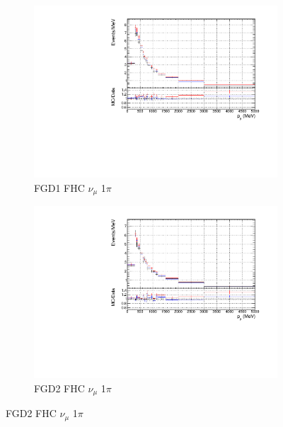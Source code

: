 \begin{figure}
\begin{subfigure}{0.49\textwidth}
  \centering
  \includegraphics[width=\textwidth]{figs/priorpred1D_p_FGD1_numuCC_1pi}
  \caption{FGD1 FHC $\nu_{\mu}$ 1$\pi$}
\end{subfigure}
\begin{subfigure}{0.49\textwidth}
  \centering
  \includegraphics[width=\textwidth]{figs/priorpred1D_p_FGD2_numuCC_1pi}
  \caption{FGD2 FHC $\nu_{\mu}$ 1$\pi$}
\end{subfigure}


\end{figure}
